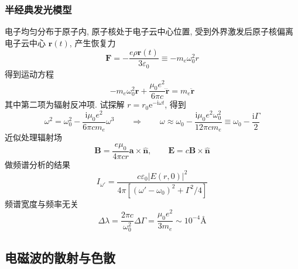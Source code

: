 \documentclass[12pt,a4paper]{article}%
\numberwithin{equation}{section}%
\renewcommand*{\vec}[1]{\bm{#1}}%
\newcommand\mi{\mathrm{i}}
\newcommand\e{\mathrm{e}}%
\newcommand*{\uvec}[1]{\hat{\vec{#1}}}
\begin{document}
\subsubsection{半经典发光模型} %
\label{ssub:semi_cla_light_emit}
电子均匀分布于原子内, 原子核处于电子云中心位置, 受到外界激发后原子核偏离电子云中心 $\vec r(t)$, 产生恢复力
\begin{equation}
    \vec F = -\frac{e\rho\vec r(t)}{3\varepsilon_0} \equiv -m_e\omega_0^2 r
\end{equation}
得到运动方程
\begin{equation}
    -m_e\omega_0^2 \vec r + \frac{\mu_0 e^2}{6\pi c}\dddot{\vec r} = m_e\ddot{\vec r}
\end{equation}
其中第二项为辐射反冲项. 试探解 $r = r_0\e^{-\mi\omega t}$, 得到
\begin{equation}
    \omega^2 = \omega_0^2 - \frac{\mi\mu_0 e^2}{6\pi c m_e}\omega^3 \qquad\Longrightarrow\qquad \omega\approx\omega_0 - \frac{\mi\mu_0 e^2\omega_0^2}{12\pi cm_e}\equiv \omega_0 - \frac{\mi\Gamma}{2}
\end{equation}
近似处理辐射场
\begin{equation}
    \vec B = \frac{e\mu_0}{4\pi cr}\vec a\times\uvec n, \qquad
    \vec E = c\vec B\times \uvec n
\end{equation}
做频谱分析的结果
\begin{equation}
    I_{\omega'} = \frac{c\varepsilon_0|E(r,0)|^2}{4\pi\left[(\omega'-\omega_0)^2 + \Gamma^2/4\right]}
\end{equation}
频谱宽度与频率无关
\begin{equation}
    \Delta\lambda = \frac{2\pi c}{\omega_0^2}\Delta\Gamma = \frac{\mu_0 e^2}{3m_e}\sim 10^{-4}\mbox{\AA}
\end{equation}
\subsection{电磁波的散射与色散} %
\label{sub:scattering_and_dispersion}
\end{document}

